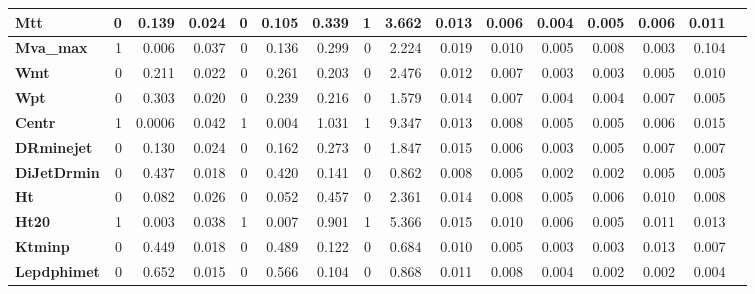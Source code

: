 \begin{sidewaystable}[htbp]
\begin{center}
\begin{tabular}{|l|r|r|r|r|r|r|r|r|r|r|r|r|r|r|r|}
\textbf{Mtt} & 0 & 0.139 & 0.024 & 0 & 0.105 & 0.339 & 1 & 3.662 & 0.013 & 0.006 & 0.004 & 0.005 & 0.006 & 0.011 \\ \hline
\textbf{Mva\_max} & 1 & 0.006 & 0.037 & 0 & 0.136 & 0.299 & 0 & 2.224 & 0.019 & 0.010 & 0.005 & 0.008 & 0.003 & 0.104 \\ \hline
\textbf{Wmt} & 0 & 0.211 & 0.022 & 0 & 0.261 & 0.203 & 0 & 2.476 & 0.012 & 0.007 & 0.003 & 0.003 & 0.005 & 0.010 \\ \hline
\textbf{Wpt} & 0 & 0.303 & 0.020 & 0 & 0.239 & 0.216 & 0 & 1.579 & 0.014 & 0.007 & 0.004 & 0.004 & 0.007 & 0.005 \\ \hline
\textbf{Centr} & 1 & 0.0006 & 0.042 & 1 & 0.004 & 1.031 & 1 & 9.347 & 0.013 & 0.008 & 0.005 & 0.005 & 0.006 & 0.015 \\ \hline
\textbf{DRminejet} & 0 & 0.130 & 0.024 & 0 & 0.162 & 0.273 & 0 & 1.847 & 0.015 & 0.006 & 0.003 & 0.005 & 0.007 & 0.007 \\ \hline
\textbf{DiJetDrmin} & 0 & 0.437 & 0.018 & 0 & 0.420 & 0.141 & 0 & 0.862 & 0.008 & 0.005 & 0.002 & 0.002 & 0.005 & 0.005 \\ \hline
\textbf{Ht} & 0 & 0.082 & 0.026 & 0 & 0.052 & 0.457 & 0 & 2.361 & 0.014 & 0.008 & 0.005 & 0.006 & 0.010 & 0.008 \\ \hline
\textbf{Ht20} & 1 & 0.003 & 0.038 & 1 & 0.007 & 0.901 & 1 & 5.366 & 0.015 & 0.010 & 0.006 & 0.005 & 0.011 & 0.013 \\ \hline
\textbf{Ktminp} & 0 & 0.449 & 0.018 & 0 & 0.489 & 0.122 & 0 & 0.684 & 0.010 & 0.005 & 0.003 & 0.003 & 0.013 & 0.007 \\ \hline
\textbf{Lepdphimet} & 0 & 0.652 & 0.015 & 0 & 0.566 & 0.104 & 0 & 0.868 & 0.011 & 0.008 & 0.004 & 0.002 & 0.002 & 0.004 \\ \hline
\end{tabular}
\end{center}
\label{tab:muoYD4jetStats}
\end{sidewaystable}